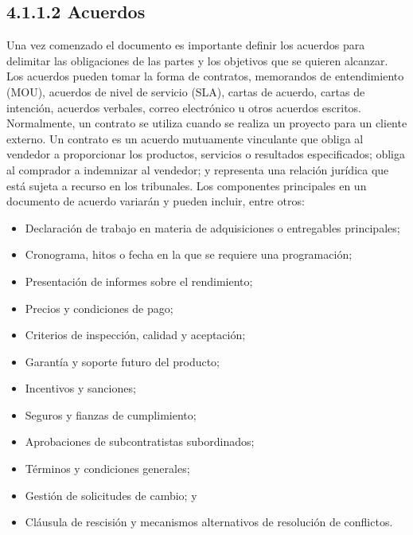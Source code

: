 \documentclass[letterpaper,12pt,openright,oneside]{article}
\theoremstyle{plain}
\begin{document}
% 
% 
\subsection*{4.1.1.2 Acuerdos}

Una vez comenzado el documento es importante definir los acuerdos para delimitar las obligaciones de las partes y los objetivos que se quieren alcanzar.
Los acuerdos pueden tomar la forma de contratos, memorandos de entendimiento (MOU), acuerdos de nivel de servicio (SLA), cartas de acuerdo, cartas de intención, acuerdos verbales, correo electrónico u otros acuerdos escritos. Normalmente, un contrato se utiliza cuando se realiza un proyecto para un cliente externo.
Un contrato es un acuerdo mutuamente vinculante que obliga al vendedor a proporcionar los productos, servicios o resultados especificados; obliga al comprador a indemnizar al vendedor; y representa una relación jurídica que está sujeta a recurso en los tribunales. Los componentes principales en un documento de acuerdo variarán y pueden incluir, entre otros: 

\begin{itemize}
    \item Declaración de trabajo en materia de adquisiciones o entregables principales;
    \item Cronograma, hitos o fecha en la que se requiere una programación;
    \item Presentación de informes sobre el rendimiento;
    \item Precios y condiciones de pago;
    \item Criterios de inspección, calidad y aceptación;
    \item Garantía y soporte futuro del producto;
    \item Incentivos y sanciones;
    \item Seguros y fianzas de cumplimiento;
    \item Aprobaciones de subcontratistas subordinados;
    \item Términos y condiciones generales;
    \item Gestión de solicitudes de cambio; y
    \item Cláusula de rescisión y mecanismos alternativos de resolución de conflictos.
\end{itemize}
% 
% 
\end{document}
